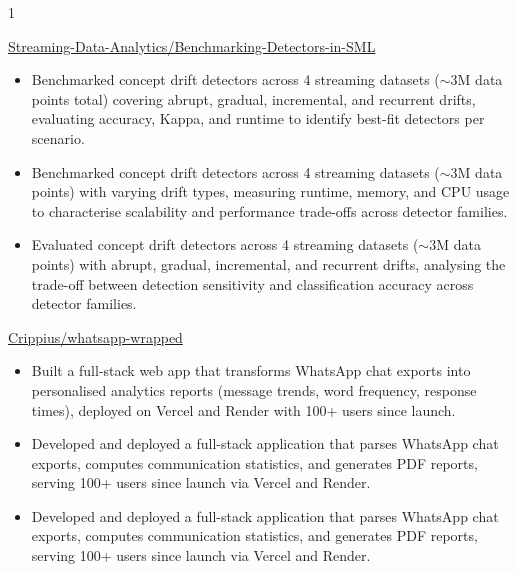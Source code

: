 \documentclass[10pt,a4paper,ragged2e,withhyper]{cv}
\begin{document}
\begin{paracol}{1}
\begin{itemize}
\end{itemize}

\medskip

 {}
{
}
{\href{https://github.com/Streaming-Data-Analytics/2024-2025_Benchmarking-Detectors-in-SML}
{Streaming-Data-Analytics/Benchmarking-Detectors-in-SML}}
\begin{itemize}

    \ifde
        \item Benchmarked concept drift detectors across 4 streaming datasets ($\sim$3M data points total) covering abrupt, gradual, incremental, and recurrent drifts, evaluating accuracy, Kappa, and runtime to identify best-fit detectors per scenario.
    \else
        \ifhpc
            \item Benchmarked concept drift detectors across 4 streaming datasets ($\sim$3M data points) with varying drift types, measuring runtime, memory, and CPU usage to characterise scalability and performance trade-offs across detector families.
        \else
            \item Evaluated concept drift detectors across 4 streaming datasets ($\sim$3M data points) with abrupt, gradual, incremental, and recurrent drifts, analysing the trade-off between detection sensitivity and classification accuracy across detector families.
        \fi
    \fi

\end{itemize}

\medskip

 {}
{
}
{\href{https://github.com/Crippius/whatsapp-wrapped}
{Crippius/whatsapp-wrapped}}
\begin{itemize}

    \ifde
        \item Built a full-stack web app that transforms WhatsApp chat exports into personalised analytics reports (message trends, word frequency, response times), deployed on Vercel and Render with 100+ users since launch.
    \else
        \ifhpc
            \item Developed and deployed a full-stack application that parses WhatsApp chat exports, computes communication statistics, and generates PDF reports, serving 100+ users since launch via Vercel and Render.
        \else
            \item Developed and deployed a full-stack application that parses WhatsApp chat exports, computes communication statistics, and generates PDF reports, serving 100+ users since launch via Vercel and Render.
        \fi
    \fi


\end{itemize}
\end{paracol}
\end{document}
